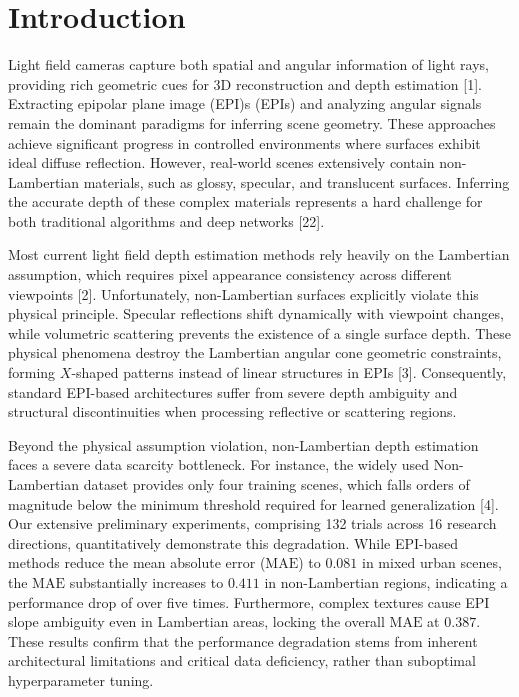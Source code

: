 \section{Introduction}

Light field cameras capture both spatial and angular information of light rays, providing rich geometric cues for 3D reconstruction and depth estimation [1]. Extracting epipolar plane image (EPI)s (EPIs) and analyzing angular signals remain the dominant paradigms for inferring scene geometry. These approaches achieve significant progress in controlled environments where surfaces exhibit ideal diffuse reflection. However, real-world scenes extensively contain non-Lambertian materials, such as glossy, specular, and translucent surfaces. Inferring the accurate depth of these complex materials represents a hard challenge for both traditional algorithms and deep networks [22].

Most current light field depth estimation methods rely heavily on the Lambertian assumption, which requires pixel appearance consistency across different viewpoints [2]. Unfortunately, non-Lambertian surfaces explicitly violate this physical principle. Specular reflections shift dynamically with viewpoint changes, while volumetric scattering prevents the existence of a single surface depth. These physical phenomena destroy the Lambertian angular cone geometric constraints, forming $X$-shaped patterns instead of linear structures in EPIs [3]. Consequently, standard EPI-based architectures suffer from severe depth ambiguity and structural discontinuities when processing reflective or scattering regions.

Beyond the physical assumption violation, non-Lambertian depth estimation faces a severe data scarcity bottleneck. For instance, the widely used Non-Lambertian dataset provides only four training scenes, which falls orders of magnitude below the minimum threshold required for learned generalization [4]. Our extensive preliminary experiments, comprising 132 trials across 16 research directions, quantitatively demonstrate this degradation. While EPI-based methods reduce the mean absolute error ($\text{MAE}$) to $0.081$ in mixed urban scenes, the $\text{MAE}$ substantially increases to $0.411$ in non-Lambertian regions, indicating a performance drop of over five times. Furthermore, complex textures cause EPI slope ambiguity even in Lambertian areas, locking the overall $\text{MAE}$ at $0.387$. These results confirm that the performance degradation stems from inherent architectural limitations and critical data deficiency, rather than suboptimal hyperparameter tuning.

